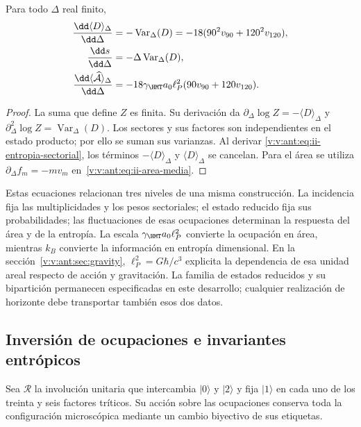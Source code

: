 \begin{proposition}
Para todo $\Delta$ real finito,
\begin{align}
 \frac{\dd\langle D\rangle_\Delta}{\dd\Delta}
 &=-\operatorname{Var}_\Delta(D)
   =-18(90^2v_{90}+120^2v_{120}),\\
 \frac{\dd s}{\dd\Delta}
 &=-\Delta\operatorname{Var}_\Delta(D),
 \label{v:v:ant:eq:ii-respuesta-entropica}\\
 \frac{\dd\langle\widehat{\mathcal A}\rangle_\Delta}{\dd\Delta}
 &=-18\gamma_{\HMT}a_0\ell_P^2(90v_{90}+120v_{120}).
 \label{v:v:ant:eq:ii-respuesta-areal}
\end{align}
\end{proposition}
\begin{proof}
La suma que define $Z$ es finita. Su derivación da
$\partial_\Delta\log Z=-\langle D\rangle_\Delta$ y
$\partial_\Delta^2\log Z=\operatorname{Var}_\Delta(D)$.
Los sectores y sus factores son independientes en el estado producto;
por ello se suman sus varianzas. Al derivar
\eqref{v:v:ant:eq:ii-entropia-sectorial}, los términos
$-\langle D\rangle_\Delta$ y $\langle D\rangle_\Delta$
se cancelan. Para el área se utiliza
$\partial_\Delta f_m=-mv_m$ en~\eqref{v:v:ant:eq:ii-area-media}.
\end{proof}

Estas ecuaciones relacionan tres niveles de una misma construcción.
La incidencia fija las multiplicidades y los pesos sectoriales; el
estado reducido fija sus probabilidades; las fluctuaciones de esas
ocupaciones determinan la respuesta del área y de la entropía.
La escala $\gamma_{\HMT}a_0\ell_P^2$ convierte la ocupación en área,
mientras $k_B$ convierte la información en entropía dimensional.
En la sección~\ref{v:v:ant:sec:gravity}, $\ell_P^2=G\hbar/c^3$ explicita
la dependencia de esa unidad areal respecto de acción y gravitación.
La familia de estados reducidos y su bipartición permanecen especificadas
en este desarrollo; cualquier realización de horizonte debe transportar
también esos dos datos.

\subsection{Inversión de ocupaciones e invariantes entrópicos}
\label{v:v:ant:sec:ii-inversion-sectorial}

Sea $\mathcal R$ la involución unitaria que intercambia $|0\rangle$
y $|2\rangle$ y fija $|1\rangle$ en cada uno de los treinta y seis
factores tríticos. Su acción sobre las ocupaciones conserva toda la
configuración microscópica mediante un cambio biyectivo de sus etiquetas.

